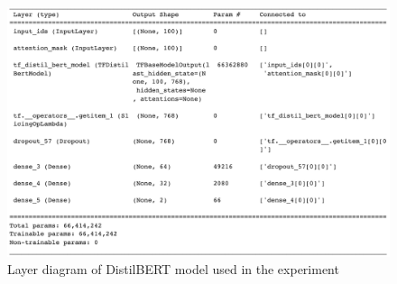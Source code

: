 \documentclass[%
	BCOR=8mm, %
	DIV=12,
	toc=bibliography, %
	toc=listof, %
	oneside, %
	egregdoesnotlikesansseriftitles, %
	]{scrbook}
\begin{document}
\begin{figure}[H]
    \centering
    \includegraphics[width=0.9\linewidth]{img/DistilBERTarch}
    \caption[Layer diagram of DistilBERT model used in the experiment]{Layer diagram of DistilBERT model used in the experiment}
    \label{fig:distilbertarch}
\end{figure}
\end{document}
